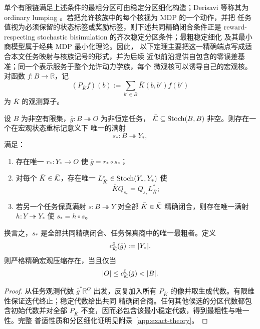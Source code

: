 单个有限链满足上述条件的最粗分区可由稳定分区细化构造；Derisavi 等称其为
ordinary lumping
\citep{DerisaviEtAl2003}。若把允许核族中的每个核视为 MDP 的一个动作，并把
任务值视为必须保留的状态标签或奖励标签，则下述共同精确闭合条件正是
reward-respecting stochastic bisimulation 的齐次稳定分区条件；最粗稳定细化
及其最小商模型属于经典 MDP 最小化理论\citep{GivanDeanGreig2003}。因此，
以下定理主要把这一精确端点写成适合本文任务映射与核族记号的形式，并为后续
近似前沿提供自包含的零误差基准；同一个表示服务于整个允许动力学族，每个
微观核可以诱导自己的宏观核。
对函数 $f:B\to\mathbb R$，记
\[
(P_{\bar K}f)(b):=\sum_{b'\in B}\bar K(b,b')f(b')
\]
为 $\bar K$ 的观测算子。

\begin{theorem}[核族的唯一最粗精确任务商]
\label{thm:minimal-exact-task-quotient}
设 $B$ 为非空有限集，$\bar g:B\twoheadrightarrow O$ 为非恒定任务，
$\bar{\mathcal K}\subseteq\operatorname{Stoch}(B,B)$ 非空。则存在一个在宏观状态重标记意义下
唯一的满射
\[
 s_*:B\twoheadrightarrow Y_*,
\]
满足：
\begin{enumerate}
  \item 存在唯一 $r_*:Y_*\to O$ 使 $\bar g=r_*\circ s_*$；
  \item 对每个 $\bar K\in\bar{\mathcal K}$，存在唯一
  $L^*_{\bar K}\in\operatorname{Stoch}(Y_*,Y_*)$ 使
  \[
  \bar KQ_{s_*}=Q_{s_*}L^*_{\bar K};
  \]
  \item 若另一个任务保真满射 $s:B\twoheadrightarrow Y$ 对全部
  $\bar K\in\bar{\mathcal K}$ 精确闭合，则存在唯一满射
  $h:Y\twoheadrightarrow Y_*$ 使 $s_*=h\circ s$。
\end{enumerate}
换言之，$s_*$ 是全部共同精确闭合、任务保真商中的唯一最粗者。定义
\begin{equation}
 c_{\bar{\mathcal K}}^{0}(\bar g):=|Y_*|.
 \label{eq:exact-task-complexity}
\end{equation}
则严格精确宏观压缩存在，当且仅当
\begin{equation}
 |O|\le c_{\bar\cK}^{0}(\bar g)<|B|.
 \label{eq:strict-exact-compression}
\end{equation}
\end{theorem}

\begin{proof}
从任务观测代数 $\bar g^*\mathbb R^O$ 出发，反复加入所有
$P_{\bar K}$ 的像并取生成代数。有限维性保证迭代终止；稳定代数给出共同
精确闭合商。任何其他候选的分区代数都包含初始代数并对全部
$P_{\bar K}$ 不变，因而必包含该最小稳定代数，得到最粗性与唯一性。完整
普适性质和分区细化证明见附录~\ref{app:exact-theory}。
\end{proof}

